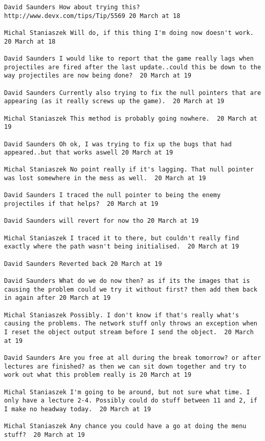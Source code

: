 \documentclass[10pt]{report}
\begin{document}
\begin{verbatim}
David Saunders How about trying this?
http://www.devx.com/tips/Tip/5569 20 March at 18

Michal Staniaszek Will do, if this thing I'm doing now doesn't work.
20 March at 18

David Saunders I would like to report that the game really lags when
projectiles are fired after the last update..could this be down to the
way projectiles are now being done?  20 March at 19

David Saunders Currently also trying to fix the null pointers that are
appearing (as it really screws up the game).  20 March at 19

Michal Staniaszek This method is probably going nowhere.  20 March at
19

David Saunders Oh ok, I was trying to fix up the bugs that had
appeared..but that works aswell 20 March at 19

Michal Staniaszek No point really if it's lagging. That null pointer
was lost somewhere in the mess as well.  20 March at 19

David Saunders I traced the null pointer to being the enemy
projectiles if that helps?  20 March at 19

David Saunders will revert for now tho 20 March at 19

Michal Staniaszek I traced it to there, but couldn't really find
exactly where the path wasn't being initialised.  20 March at 19

David Saunders Reverted back 20 March at 19

David Saunders What do we do now then? as if its the images that is
causing the problem could we try it without first? then add them back
in again after 20 March at 19

Michal Staniaszek Possibly. I don't know if that's really what's
causing the problems. The network stuff only throws an exception when
I reset the object output stream before I send the object.  20 March
at 19

David Saunders Are you free at all during the break tomorrow? or after
lectures are finished? as then we can sit down together and try to
work out what this problem really is 20 March at 19

Michal Staniaszek I'm going to be around, but not sure what time. I
only have a lecture 2-4. Possibly could do stuff between 11 and 2, if
I make no headway today.  20 March at 19

Michal Staniaszek Any chance you could have a go at doing the menu
stuff?  20 March at 19


\end{verbatim}
\end{document}
